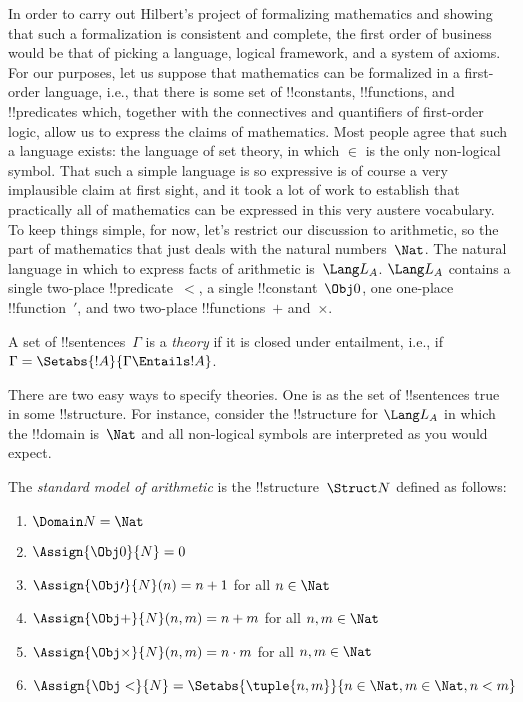 \documentclass[../../../include/open-logic-section]{subfiles}
\begin{document}


In order to carry out Hilbert's project of formalizing mathematics and
showing that such a formalization is consistent and complete, the
first order of business would be that of picking a language, logical
framework, and a system of axioms.  For our purposes, let us suppose
that mathematics can be formalized in a first-order language, i.e.,
that there is some set of !!{constant}s, !!{function}s, and
!!{predicate}s which, together with the connectives and quantifiers of
first-order logic, allow us to express the claims of mathematics.
Most people agree that such a language exists: the language of set
theory, in which $\in$ is the only non-logical symbol.  That such a
simple language is so expressive is of course a very implausible claim
at first sight, and it took a lot of work to establish that
practically all of mathematics can be expressed in this very austere
vocabulary.  To keep things simple, for now, let's restrict our
discussion to arithmetic, so the part of mathematics that just deals
with the natural numbers~$\Nat$.  The natural language in which to
express facts of arithmetic is~$\Lang L_A$. $\Lang L_A$ contains a
single two-place !!{predicate}~$<$, a single !!{constant}~$\Obj 0$,
one one-place !!{function}~$\prime$, and two two-place
!!{function}s~$+$ and~$\times$.

\begin{defn}
A set of !!{sentence}s~$\Gamma$ is a \emph{theory} if it is closed
under entailment, i.e., if $\Gamma = \Setabs{!A}{\Gamma \Entails
!A}$.
\end{defn}

There are two easy ways to specify theories. One is as the set of
!!{sentence}s true in some !!{structure}.  For instance, consider the
!!{structure} for $\Lang L_A$ in which the !!{domain} is~$\Nat$ and
all non-logical symbols are interpreted as you would expect.

\begin{defn}
The \emph{standard model of arithmetic} is the !!{structure}~$\Struct
N$ defined as follows:
\begin{enumerate}
\item $\Domain N = \Nat$
\item $\Assign{\Obj 0}{N} = 0$
\item $\Assign{\Obj \prime}{N}(n) = n + 1$ for all $n \in \Nat$
\item $\Assign{\Obj +}{N}(n, m) = n + m$ for all $n, m \in \Nat$
\item $\Assign{\Obj \times}{N}(n, m) = n\cdot m$ for all $n, m \in \Nat$
\item $\Assign{\Obj <}{N} = \Setabs{\tuple{n, m}}{n \in \Nat, m \in
  \Nat, n < m}$
\end{enumerate}
\end{defn}
\end{document}
